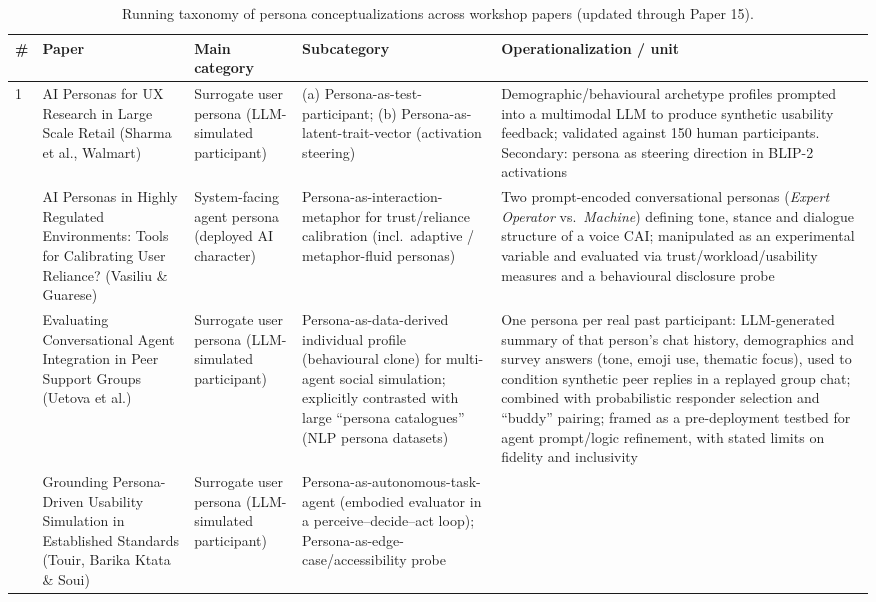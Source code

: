 \begin{table}[t]
\centering
\caption{Running taxonomy of persona conceptualizations across workshop papers (updated through Paper 15).}
\label{tab:persona-taxonomy}
\small
\begin{tabular}{p{0.5cm} p{3.6cm} p{3.4cm} p{3.6cm} p{3.6cm}}
\toprule
\textbf{\#} & \textbf{Paper} & \textbf{Main category} & \textbf{Subcategory} & \textbf{Operationalization / unit} \\
\midrule
1 & AI Personas for UX Research in Large Scale Retail (Sharma et al., Walmart) &
Surrogate user persona (LLM-simulated participant) &
(a) Persona-as-test-participant; (b) Persona-as-latent-trait-vector (activation steering) &
Demographic/behavioural archetype profiles prompted into a multimodal LLM to produce synthetic usability feedback; validated against 150 human participants. Secondary: persona as steering direction in BLIP-2 activations \\
\addlinespace
2 & AI Personas in Highly Regulated Environments: Tools for Calibrating User Reliance? (Vasiliu \& Guarese) &
System-facing agent persona (deployed AI character) &
Persona-as-interaction-metaphor for trust/reliance calibration (incl.\ adaptive / metaphor-fluid personas) &
Two prompt-encoded conversational personas (\textit{Expert Operator} vs.\ \textit{Machine}) defining tone, stance and dialogue structure of a voice CAI; manipulated as an experimental variable and evaluated via trust/workload/usability measures and a behavioural disclosure probe \\
\addlinespace
3 & Evaluating Conversational Agent Integration in Peer Support Groups (Uetova et al.) &
Surrogate user persona (LLM-simulated participant) &
Persona-as-data-derived individual profile (behavioural clone) for multi-agent social simulation; explicitly contrasted with large ``persona catalogues'' (NLP persona datasets) &
One persona per real past participant: LLM-generated summary of that person's chat history, demographics and survey answers (tone, emoji use, thematic focus), used to condition synthetic peer replies in a replayed group chat; combined with probabilistic responder selection and ``buddy'' pairing; framed as a pre-deployment testbed for agent prompt/logic refinement, with stated limits on fidelity and inclusivity \\
\addlinespace
4 & Grounding Persona-Driven Usability Simulation in Established Standards (Touir, Barika Ktata \& Soui) &
Surrogate user persona (LLM-simulated participant) &
Persona-as-autonomous-task-agent (embodied evaluator in a perceive--decide--act loop); Persona-as-edge-case/accessibility probe &

\end{tabular}
\end{table}
